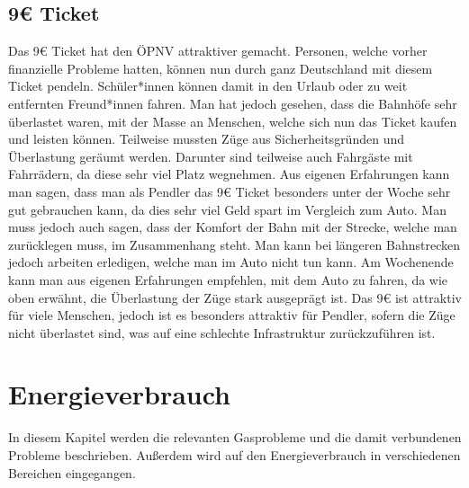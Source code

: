 \documentclass[a4paper,12pt]{scrartcl}
\begin{document}
\subsection{9€ Ticket}
Das 9€ Ticket hat den ÖPNV attraktiver gemacht. Personen, welche vorher finanzielle Probleme hatten, können nun durch ganz Deutschland mit diesem Ticket pendeln. Schüler*innen können damit in den Urlaub oder zu weit entfernten Freund*innen fahren. Man hat jedoch gesehen, dass die Bahnhöfe sehr überlastet waren, mit der Masse an Menschen, welche sich nun das Ticket kaufen und leisten können. Teilweise mussten Züge aus Sicherheitsgründen und Überlastung geräumt werden. Darunter sind teilweise auch Fahrgäste mit Fahrrädern, da diese sehr viel Platz wegnehmen. Aus eigenen Erfahrungen kann man sagen, dass man als Pendler das 9€ Ticket besonders unter der Woche sehr gut gebrauchen kann, da dies sehr viel Geld spart im Vergleich zum Auto. Man muss jedoch auch sagen, dass der Komfort der Bahn mit der Strecke, welche man zurücklegen muss, im Zusammenhang steht. Man kann bei längeren Bahnstrecken jedoch arbeiten erledigen, welche man im Auto nicht tun kann. Am Wochenende kann man aus eigenen Erfahrungen empfehlen, mit dem Auto zu fahren, da wie oben erwähnt, die Überlastung der Züge stark ausgeprägt ist. Das 9€ ist attraktiv für viele Menschen, jedoch ist es besonders attraktiv für Pendler, sofern die Züge nicht überlastet sind, was auf eine schlechte Infrastruktur zurückzuführen ist.

\section{Energieverbrauch}
In diesem Kapitel werden die relevanten Gasprobleme und die damit verbundenen Probleme beschrieben. Außerdem wird auf den Energieverbrauch in verschiedenen Bereichen eingegangen.
\end{document}
